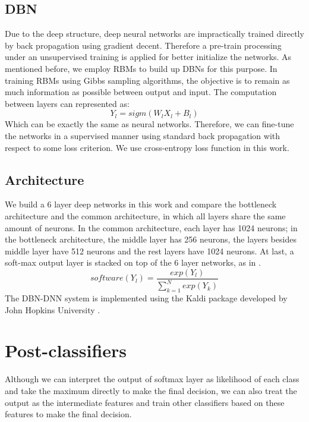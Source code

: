 \documentclass{article}
\begin{document}
\subsection{DBN}\label{sec:train}
Due to the deep structure, deep neural networks are impractically trained directly by back propagation using gradient decent. Therefore a pre-train processing under an unsupervised training is applied for better initialize the networks. As mentioned before, we employ RBMs to build up DBNs for this purpose. 
In training RBMs using Gibbs sampling algorithms, the objective is to remain as much information as possible between output and input. The computation between layers can represented as:
 \begin{equation}\label{dbn}
Y_{l} = sigm(W_{l}X_{l} + B_{l})
\end{equation}  
Which can be exactly the same as neural networks. Therefore, we can fine-tune the networks in a supervised manner using standard back propagation with respect to some loss criterion. We use cross-entropy loss function in this work.  

\subsection{Architecture}\label{sec:arch}
We build a 6 layer deep networks in this work and compare the bottleneck architecture and the common architecture, in which all layers share the same amount of neurons. In the common architecture, each layer has 1024 neurons; in the bottleneck architecture, the middle layer has 256 neurons, the layers besides middle layer have 512 neurons and the rest layers have 1024 neurons. At last, a soft-max output layer is stacked on top of the 6 layer networks, as in .
\begin{equation}\label{softmax}
software(Y_{l}) = \frac{exp(Y_{l})}{\sum_{k=1}^N exp(Y_{k})}
\end{equation}
The DBN-DNN system is implemented using the Kaldi package developed by John Hopkins University \cite{povey2011kaldi}.
 
\section{Post-classifiers}\label{sec:class}
Although we can interpret the output of softmax layer as likelihood of each class and take the maximum directly to make the final decision, we can also treat the output as the intermediate features and train other classifiers based on these features to make the final decision. 
\end{document}
